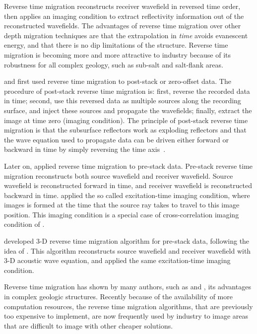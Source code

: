 Reverse time migration reconstructs %
receiver wavefield in reversed time order, then applies an imaging condition to extract reflectivity information out of the reconstructed wavefields. 
The advantages of reverse time migration over other depth migration techniques are that the extrapolation in \emph{time} avoids evanescent energy, and that there is no dip limitations of the structure. Reverse time migration is becoming more and more attractive to industry because of its robustness for all complex geology, such as sub-salt and salt-flank areas.



\cite{SEG-1983-S10.1} and \cite{GEO48-11-15141524} first used reverse time migration to post-stack or zero-offset data. The procedure of post-stack reverse time migration is: first, reverse the recorded data in time; second, use this reversed data as multiple sources along the recording surface, and inject these sources and propagate the wavefields; finally, extract the image at time zero (imaging condition). The principle of post-stack reverse time migration is that the subsurface reflectors work as exploding reflectors and that the wave equation used to propagate data can be driven either forward or backward in time by simply reversing the time axis~\cite[]{levin:581}.


Later on, \cite{chang:67} applied reverse time migration to pre-stack data. Pre-stack reverse time migration reconstructs both source wavefield and receiver wavefield. Source wavefield is reconstructed forward in time, and receiver wavefield is reconstructed backward in time. \cite{chang:67} applied the so called excitation-time imaging condition, where images is formed at the time that the source ray takes to travel to this image position. This imaging condition is a special case of cross-correlation imaging condition of \cite{Claerbout.iei}.
 
\cite{chang:513} developed 3-D reverse time migration algorithm for pre-stack data, following the idea of \cite{chang:67}. This algorithm reconstructs source wavefield and receiver wavefield with 3-D acoustic wave equation, and applied the same excitation-time imaging condition.

Reverse time migration has shown by many authors, such as \cite{jones:2140} and \cite{boechat:2427}, its advantages in complex geologic structures. Recently because of the availability of more computation resources, the reverse time migration algorithms, that are previously too expensive to implement, are now frequently used by industry to image areas that are difficult to image with other cheaper solutions.


